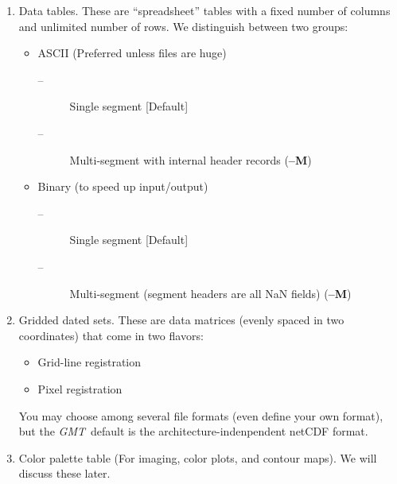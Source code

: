 \documentclass{report}
\newcommand{\GMT}{\textit{GMT}}%
\newcommand{\GMT}{\htmladdnormallink{\texttt{[image: eps/GMT\_glyph10.eps]}}{http://gmt.soest.hawaii.edu}}%
\newcommand{\GMT}{\htmladdnormallink{\textbf{GMT}}{http://gmt.soest.hawaii.edu}}%
\begin{document}
\begin{enumerate}

\item Data tables.
These are ``spreadsheet'' tables with a fixed number of columns and
unlimited number of rows.  We distinguish between two groups:

\begin{itemize}

\item ASCII (Preferred unless files are huge)

\begin{description}

\item [--] Single segment [Default]

\item [--] Multi-segment with internal header records ({\bf --M})
\end{description}

\item Binary (to speed up input/output)

\begin{description}

\item [--] Single segment [Default]

\item [--] Multi-segment (segment headers are all NaN fields) ({\bf --M})
\end{description}

\end{itemize}

\item Gridded dated sets.
These are data matrices (evenly spaced in two coordinates) that come
in two flavors:

\begin{itemize}

\item Grid-line registration

\item Pixel registration

\end{itemize}

You may choose among several file formats (even define your own format),
but the \GMT\ default is the architecture-indenpendent netCDF format.

\item Color palette table (For imaging, color plots, and contour maps).
We will discuss these later.

\end{enumerate}
\end{document}
